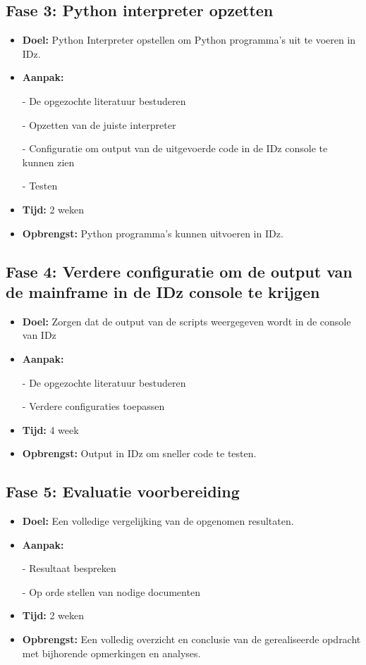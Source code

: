 \subsection{Fase 3: Python interpreter opzetten}
\begin{itemize}
    \item \textbf{Doel:}
    Python Interpreter opstellen om Python programma's uit te voeren in IDz.
    \item \textbf{Aanpak:}
    \item[-] De opgezochte literatuur bestuderen
    \item[-] Opzetten van de juiste interpreter
    \item[-] Configuratie om output van de uitgevoerde code in de IDz console te kunnen zien
    \item[-] Testen
    
    \item \textbf{Tijd:} 2 weken
    \item \textbf{Opbrengst:}
    Python programma's kunnen uitvoeren in IDz.
\end{itemize}


\subsection{Fase 4: Verdere configuratie om de output van de mainframe in de IDz console te krijgen}
\begin{itemize}
    \item \textbf{Doel:}
    Zorgen dat de output van de scripts weergegeven wordt in de console van IDz
    \item \textbf{Aanpak:}
    \item[-] De opgezochte literatuur bestuderen
    \item[-] Verdere configuraties toepassen
    
    \item \textbf{Tijd:} 4 week
    \item \textbf{Opbrengst:}
    Output in IDz om sneller code te testen. 
\end{itemize}

\subsection{Fase 5: Evaluatie voorbereiding}
\begin{itemize}
    \item \textbf{Doel:}
    Een volledige vergelijking van de opgenomen resultaten.
    \item \textbf{Aanpak:}
    \item[-] Resultaat bespreken
    \item[-] Op orde stellen van nodige documenten
    \item \textbf{Tijd:} 2 weken
    \item \textbf{Opbrengst:}
    Een volledig overzicht en conclusie van de gerealiseerde opdracht met bijhorende opmerkingen en analyses. 
\end{itemize}



